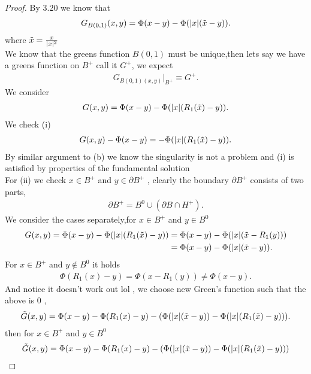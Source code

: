 \begin{proof}
 By 3.20 we know that 
 \begin{align*}
   G_{B(0,1)}(x,y) = \Phi(x-y) - \Phi(\lvert x\rvert(\tilde{x}-y ))
 .\end{align*}
 where $\tilde{x} = \frac{x}{\lvert x\rvert^2} $\\
 We know that the greens function $B(0,1)$ must be unique,then lets say we have a greens function on $B^{+} $ call it $G^{+} $, we expect 
 \begin{align*}
   G_{B(0,1)(x,y)} \rvert_{B^{+} } \equiv G^{+} 
 .\end{align*}
We consider 
\begin{align*}
  G(x,y) = \Phi(x-y) - \Phi(\lvert x\rvert(R_1(\tilde{x})-y))
.\end{align*}
We check (i)
\begin{align*}
  G(x,y) - \Phi(x-y) =-\Phi(\lvert x\rvert(R_1(\tilde{x})-y))
.\end{align*}
By similar argument to (b) we know the singularity is not a problem and (i) is satisfied by properties of the fundamental solution\\
For (ii) we check $x \in  B^{+}  $ and $y \in  \partial B^{+} $ , clearly the boundary $\partial B^{+} $ consists of two parts,
\begin{align*}
  \partial B^{+}   = B^{0} \cup (\partial B \cap H^{+})     
.\end{align*}
We consider the cases separately,for $x \in  B^{+} $ and $y \in  B^{0} $ 
\begin{align*}
  G(x,y) = \Phi(x-y) - \Phi(\lvert x\rvert(R_1(\tilde{x})-y))  &= \Phi(x-y) - \Phi(\lvert x\rvert(\tilde{x}-R_1(y)))\\
                                                        &=  \Phi(x-y) - \Phi(\lvert x\rvert(\tilde{x} - y ))
.\end{align*}
For $x \in  B^{+} $ and $y \notin B^{0} $ it holds 
\begin{align*}
  \Phi(R_{1}(x) - y) = \Phi(x-R_{1}(y)) \neq  \Phi(x-y)
.\end{align*}
And notice it doesn't work out lol , we choose new Green's function such that the above is 0 ,
\begin{align*}
  \tilde{G}(x,y) = \Phi(x-y) - \Phi(R_{1}(x)-y)  - (\Phi(\lvert x\rvert(\tilde{x} - y )) - \Phi(\lvert x\rvert(R_{1}(\tilde{x})-y)))
.\end{align*}
then for $x \in  B^{+} $ and $y \in  B^{0} $
\begin{align*}
 \tilde{G}(x,y) &=   \Phi(x-y) - \Phi(R_{1}(x)-y)  - (\Phi(\abs{x}(\tilde{x} - y )) - \Phi(\abs{x}(R_{1}(\tilde{x})-y)))\\

\end{align*}
\end{proof}
